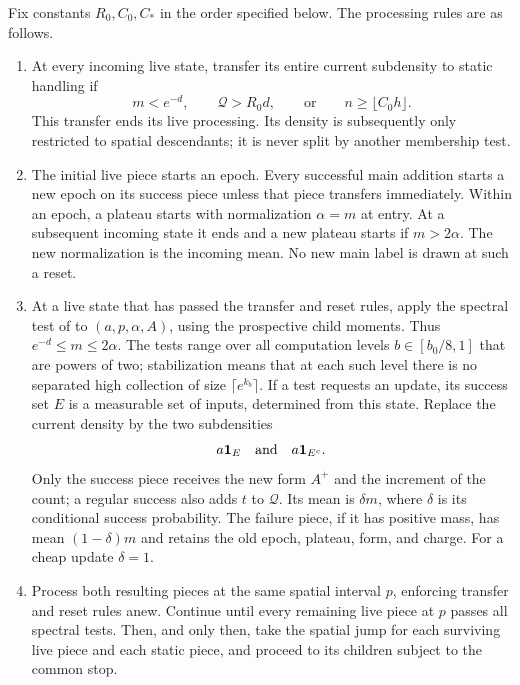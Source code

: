 Fix constants $R_0,C_0,C_*$ in the order specified below.  The
processing rules are as follows.
\begin{enumerate}[label=\arabic*.,leftmargin=*]
\item At every incoming live state, transfer its entire current
subdensity to static handling if
\[
 m<e^{-d},\qquad \mathcal Q>R_0d,
       \qquad\text{or}\qquad n\ge\lfloor C_0h\rfloor.
\]
This transfer ends its live processing.  Its density is subsequently
only restricted to spatial descendants; it is never split by another
membership test.

\item The initial live piece starts an epoch.  Every successful main
addition starts a new epoch on its success piece unless that piece
transfers immediately.  Within an epoch, a plateau starts with
normalization $\alpha=m$ at entry.  At a subsequent incoming state it
ends and a new plateau starts if $m>2\alpha$.  The new normalization
is the incoming mean.  No new main label is drawn at such a reset.

\item At a live state that has passed the transfer and reset rules,
apply the spectral test of  to
$(a,p,\alpha,A)$, using the prospective child moments.  Thus
$e^{-d}\le m\le2\alpha$.  The tests range over all computation
levels $b\in[b_0/8,1]$ that are powers of two; stabilization means
that at each such level there is no separated high collection of
size $\lceil e^{k_b}\rceil$.  If a test requests an update, its success
set $E$ is a measurable set of inputs, determined from this state.
Replace the current density by the two subdensities
\[
 a\mathbf1_E\quad\hbox{and}\quad a\mathbf1_{E^c}.
\]
Only the success piece receives the new form $A^+$ and the increment
of the count; a regular success also adds $t$ to $\mathcal Q$.
Its mean is $\delta m$, where $\delta$ is its conditional success
probability.  The failure piece, if it has positive mass, has mean
$(1-\delta)m$ and retains the old epoch, plateau, form, and charge.
For a cheap update $\delta=1$.

\item Process both resulting pieces at the same spatial interval
$p$, enforcing transfer and reset rules anew.  Continue until every
remaining live piece at $p$ passes all spectral tests.  Then, and only
then, take the spatial jump for each surviving live piece and each
static piece, and proceed to its children subject to the common stop.
\end{enumerate}


